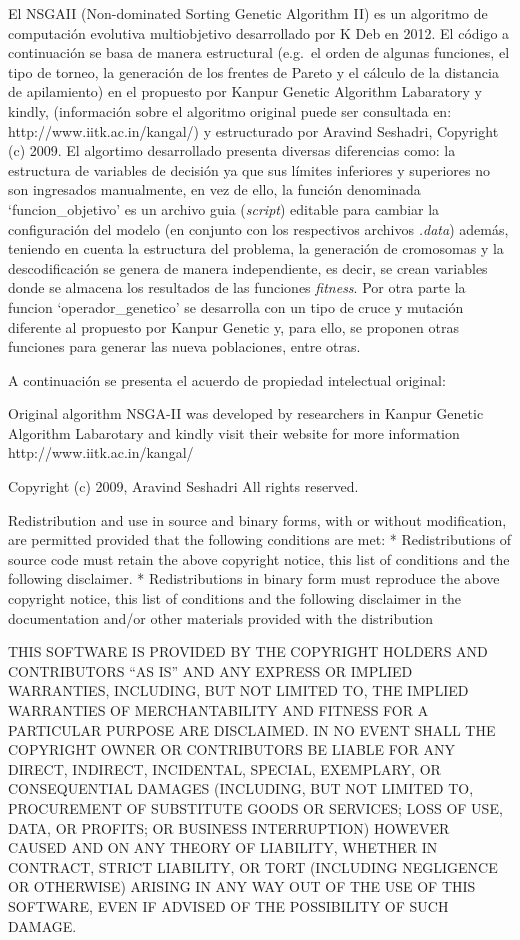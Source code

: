 \documentclass[11pt]{article}
\begin{document}
El NSGAII (Non-dominated Sorting Genetic Algorithm II) es un algoritmo
de computación evolutiva multiobjetivo desarrollado por K Deb en 2012.
El código a continuación se basa de manera estructural (e.g.~el orden de
algunas funciones, el tipo de torneo, la generación de los frentes de
Pareto y el cálculo de la distancia de apilamiento) en el propuesto por
Kanpur Genetic Algorithm Labaratory y kindly, (información sobre el
algoritmo original puede ser consultada en:
http://www.iitk.ac.in/kangal/) y estructurado por Aravind Seshadri,
Copyright (c) 2009. El algortimo desarrollado presenta diversas
diferencias como: la estructura de variables de decisión ya que sus
límites inferiores y superiores no son ingresados manualmente, en vez de
ello, la función denominada `funcion\_objetivo' es un archivo guia
(\emph{script}) editable para cambiar la configuración del modelo (en
conjunto con los respectivos archivos \emph{.data}) además, teniendo en
cuenta la estructura del problema, la generación de cromosomas y la
descodificación se genera de manera independiente, es decir, se crean
variables donde se almacena los resultados de las funciones
\emph{fitness}. Por otra parte la funcion `operador\_genetico' se
desarrolla con un tipo de cruce y mutación diferente al propuesto por
Kanpur Genetic y, para ello, se proponen otras funciones para generar
las nueva poblaciones, entre otras.

A continuación se presenta el acuerdo de propiedad intelectual original:

Original algorithm NSGA-II was developed by researchers in Kanpur
Genetic Algorithm Labarotary and kindly visit their website for more
information http://www.iitk.ac.in/kangal/

Copyright (c) 2009, Aravind Seshadri All rights reserved.

Redistribution and use in source and binary forms, with or without
modification, are permitted provided that the following conditions are
met: * Redistributions of source code must retain the above copyright
notice, this list of conditions and the following disclaimer. *
Redistributions in binary form must reproduce the above copyright
notice, this list of conditions and the following disclaimer in the
documentation and/or other materials provided with the distribution

THIS SOFTWARE IS PROVIDED BY THE COPYRIGHT HOLDERS AND CONTRIBUTORS ``AS
IS'' AND ANY EXPRESS OR IMPLIED WARRANTIES, INCLUDING, BUT NOT LIMITED
TO, THE IMPLIED WARRANTIES OF MERCHANTABILITY AND FITNESS FOR A
PARTICULAR PURPOSE ARE DISCLAIMED. IN NO EVENT SHALL THE COPYRIGHT OWNER
OR CONTRIBUTORS BE LIABLE FOR ANY DIRECT, INDIRECT, INCIDENTAL, SPECIAL,
EXEMPLARY, OR CONSEQUENTIAL DAMAGES (INCLUDING, BUT NOT LIMITED TO,
PROCUREMENT OF SUBSTITUTE GOODS OR SERVICES; LOSS OF USE, DATA, OR
PROFITS; OR BUSINESS INTERRUPTION) HOWEVER CAUSED AND ON ANY THEORY OF
LIABILITY, WHETHER IN CONTRACT, STRICT LIABILITY, OR TORT (INCLUDING
NEGLIGENCE OR OTHERWISE) ARISING IN ANY WAY OUT OF THE USE OF THIS
SOFTWARE, EVEN IF ADVISED OF THE POSSIBILITY OF SUCH DAMAGE.
\end{document}
